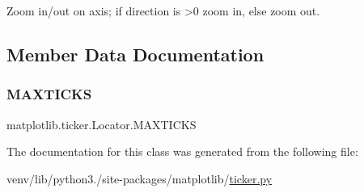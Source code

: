 \begin{DoxyVerb}Zoom in/out on axis; if direction is >0 zoom in, else zoom out.\end{DoxyVerb}
 

\subsection{Member Data Documentation}
\mbox{\label{classmatplotlib_1_1ticker_1_1Locator_aabe4575c4dfa27e5debfddec71b80fcc}} 
\subsubsection{\texorpdfstring{M\+A\+X\+T\+I\+C\+KS}{MAXTICKS}}
{\footnotesize\ttfamily matplotlib.\+ticker.\+Locator.\+M\+A\+X\+T\+I\+C\+KS\hspace{0.3cm}{\ttfamily [static]}}



The documentation for this class was generated from the following file\+:\begin{DoxyCompactItemize}
\item 
venv/lib/python3./site-\/packages/matplotlib/\hyperlink{ticker_8py}{ticker.\+py}\end{DoxyCompactItemize}
